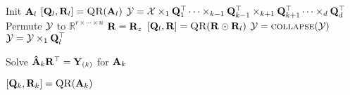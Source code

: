 \begin{algorithmic}[1]
      \State Init $\mat{A}_l$
      \State $[\mat{Q}_l,\mat{R}_l] = \Call{QR}{\mat{A}_l}$ 
      \EndFor
        \State $\T{Y} =  \T{X} \times_1 \mat{Q}_1^\top \dots \times_{k-1} \mat{Q}_{k-1}^\top \times_{k+1} \mat{Q}_{k+1}^\top \dots \times_d \mat{Q}_d^\top$ \label{l:Pair-TTM} 
        \State Permute $\T[]{Y}$ to $\mathbb{R}^{r \times \cdots \times n}$
        \State {} 
        \State $\mat{R} = \mat{R}_z$
         
        \State $[\mat{Q}_l,\mat{R}] = \Call{QR}{\mat{R} \odot \mat{R}_l}$
        \State $\T{Y}= \Call{collapse}{\T{Y}}$
        \State $\T[]{Y} = \T[]{Y} \times_1 \mat{Q}_l^\top$  \label{l:pair-R-TTM}

        \EndFor
              
      \State Solve $  \mat{\hat{A}}_k\mat{R}^\top = \mat{Y}_{(k)}$ for $\mat{A}_k$ 
      
      \State $[\mat{Q}_k,\mat{R}_k] = \Call{QR}{\mat{A}_k}$   
      \EndFor
      \EndWhile
    \EndFunction
  \end{algorithmic}